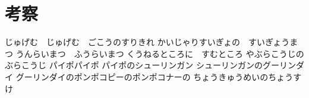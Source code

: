 \chapter{考察}\label{chap:discussion}
じゅげむ　じゅげむ　ごこうのすりきれ
かいじゃりすいぎょの　すいぎょうまつ
うんらいまつ　ふうらいまつ
くうねるところに　すむところ
やぶらこうじの　ぶらこうじ
パイポパイポ
パイポのシューリンガン
シューリンガンのグーリンダイ
グーリンダイのポンポコピーのポンポコナーの
ちょうきゅうめいのちょうすけ